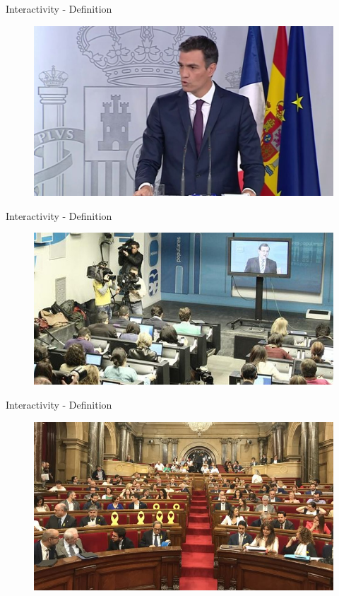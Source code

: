 \documentclass{beamer}
\begin{document}
\begin{frame}{Interactivity - Definition} 
    \begin{figure}[h]
        \includegraphics[width=\textwidth]{pedrosanchez.jpg}
    \end{figure}
\end{frame}

\begin{frame}{Interactivity - Definition} 
    \begin{figure}[h]
        \includegraphics[width=\textwidth]{rajow.jpg}
    \end{figure}
\end{frame}

\begin{frame}{Interactivity - Definition} 
    \begin{figure}[h]
        \includegraphics[width=\textwidth]{catalunya.jpg}
    \end{figure}
\end{frame}
\end{document}

